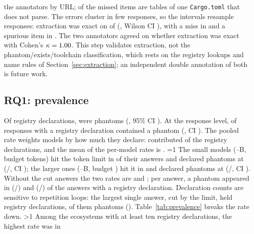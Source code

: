 \documentclass[conference]{IEEEtran}
\providecommand{\rHasGroups}{0}\providecommand{\rHasHistCost}{0}\providecommand{\rGateEqFilter}{0}
\begin{document}
the annotators by URL; \rValMissTop{} of the \rValMissed{} missed items are tables of one \texttt{Cargo.toml} that does
not parse. The errors cluster in few responses\ifnum{}, so the intervals resample responses\fi: extraction
was exact on \rValRespExact{} of \rValN{} (\rValRespExactPct, Wilson CI \rValRespExactCI), with a miss in
\rValRespMissed{} and a spurious item in \rValRespSpur.\ifnum{}\ifnum{} The two annotators
agreed on whether extraction was exact with Cohen's $\kappa=1.00$.\fi\fi{} This step validates extraction, not
the phantom/exists/toolchain classification,
which rests on the registry lookups and name rules of Section~\ref{sec:extraction}; an independent double annotation of
both is future work.
\fi

\subsection{RQ1: prevalence}
\label{sec:rq1}
Of \rDeclRegistry{} registry declarations, \rDeclPhantom{} were phantoms (\rPhantomDecl, 95\% CI \rPhantomDeclCI).
At the response level, \rRespK{} of \rRespN{} responses with a registry declaration contained a phantom
(\rPhantomResp, CI \rPhantomRespCI). The pooled rate weights models by how much they declare: \rTopModel{} contributed
\rTopModelShare{} of the registry declarations, and the mean of the per-model rates is \rMacroPhantom.
\ifnum\rHasGroups=1
The \rGrpSmallN{} small models (\rGrpSmallMinB--\rGrpSmallMaxB B, budget \rBudgetMin{} tokens) hit the token limit in
\rGrpSmallTrunc{} of their answers and declared phantoms at \rGrpSmallDecl{} (\rGrpSmallK/\rGrpSmallDeclN, CI
\rGrpSmallDeclCI); the \rGrpLargeN{} larger ones (\rGrpLargeMinB--\rGrpLargeMaxB B, budget \rBudgetMax) hit it in
\rGrpLargeTrunc{} and declared phantoms at \rGrpLargeDecl{} (\rGrpLargeK/\rGrpLargeDeclN, CI \rGrpLargeDeclCI).
Without the cut answers the two rates are \rGrpSmallDeclNoTrunc{} and \rGrpLargeDeclNoTrunc; per answer, a phantom
appeared in \rGrpSmallResp{} (\rGrpSmallRespK/\rGrpSmallRespN) and \rGrpLargeResp{} (\rGrpLargeRespK/\rGrpLargeRespN) of
the answers with a registry declaration.
\fi
\ifnum{} Declaration counts are sensitive to repetition loops: the largest single answer, cut by the limit,
held \rMaxAnsDecl{} registry declarations, \rMaxAnsPhantom{} of them phantoms (\rMaxAnsModel). \fi
Table~\ref{tab:prevalence} breaks the rate down.
\ifnum\rNEcoTen>1
Among the \rNEcoTen{} ecosystems with at least ten registry declarations, the highest rate was in \rMaxEco{}
\end{document}
